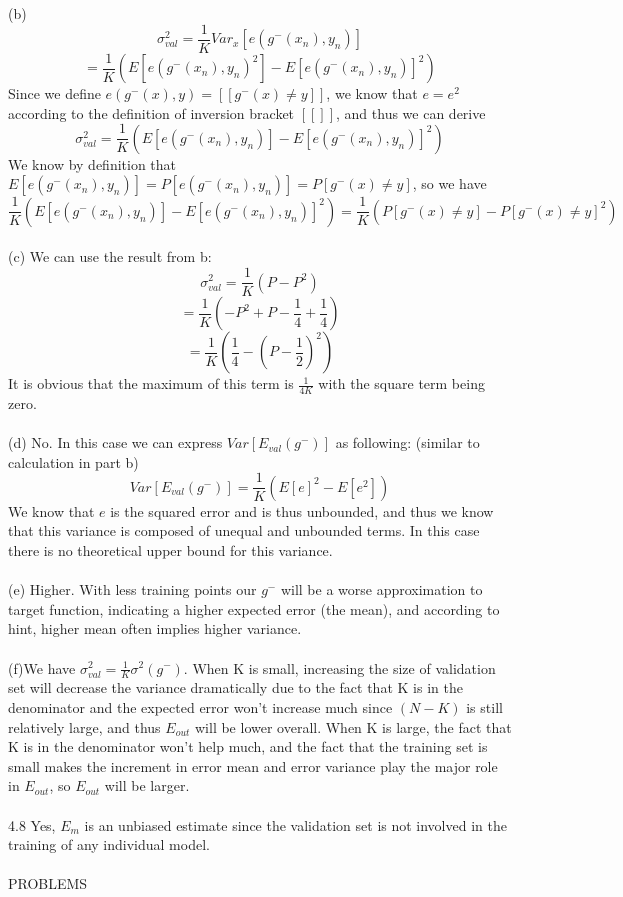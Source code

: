\documentclass[12pt]{article}
\begin{document}
(b)\\
$$\sigma^2_{val}=\frac{1}{K}Var_{x}[e(g^-(x_n),y_n)]$$
$$=\frac{1}{K}(E[e(g^-(x_n),y_n)^2]-E[e(g^-(x_n),y_n)]^2)$$
Since we define $e(g^-(x),y)=[\![g^-(x)\neq y]\!]$, we know that $e=e^2$ according to the definition of inversion bracket $[\![]\!]$, and thus we can derive
$$\sigma^2_{val}=\frac{1}{K}(E[e(g^-(x_n),y_n)]-E[e(g^-(x_n),y_n)]^2)$$
We know by definition that $E[e(g^-(x_n),y_n)]=P[e(g^-(x_n),y_n)]=P[g^-(x)\neq y]$, so we have
$$\frac{1}{K}(E[e(g^-(x_n),y_n)]-E[e(g^-(x_n),y_n)]^2)=\frac{1}{K}(P[g^-(x)\neq y]-P[g^-(x)\neq y]^2)$$
\\
(c) We can use the result from b:
$$\sigma^2_{val}=\frac{1}{K}(P-P^2)$$
$$=\frac{1}{K}(-P^2+P-\frac{1}{4}+\frac{1}{4})$$
$$=\frac{1}{K}(\frac{1}{4}-(P-\frac{1}{2})^2)$$
It is obvious that the maximum of this term is $\frac{1}{4K}$ with the square term being zero. \\\\
(d) No. In this case we can express $Var[E_{val}(g^-)]$ as following: (similar to calculation in part b)
$$Var[E_{val}(g^-)]=\frac{1}{K}(E[e]^2-E[e^2])$$
We know that $e$ is the squared error and is thus unbounded, and thus we know that this variance is composed of unequal and unbounded terms. In this case there is no theoretical upper bound for this variance.\\\\
(e) Higher. With less training points our $g^-$ will be a worse approximation to target function, indicating a higher expected error (the mean), and according to hint, higher mean often implies higher variance.\\\\
(f)We have $\sigma^2_{val}=\frac{1}{K}\sigma^2(g^-)$. When K is small, increasing the size of validation set will decrease the variance dramatically due to the fact that K is in the denominator and the expected error won't increase much since $(N-K)$ is still relatively large, and thus $E_{out}$ will be lower overall. When K is large, the fact that K is in the denominator won't help much, and the fact that the training set is small makes the increment in error mean and error variance play the major role in $E_{out}$, so $E_{out}$ will be larger.\\\\
4.8 Yes, $E_m$ is an unbiased estimate since the validation set is not involved in the training of any individual model. \\\\
PROBLEMS\\\\
\end{document}
